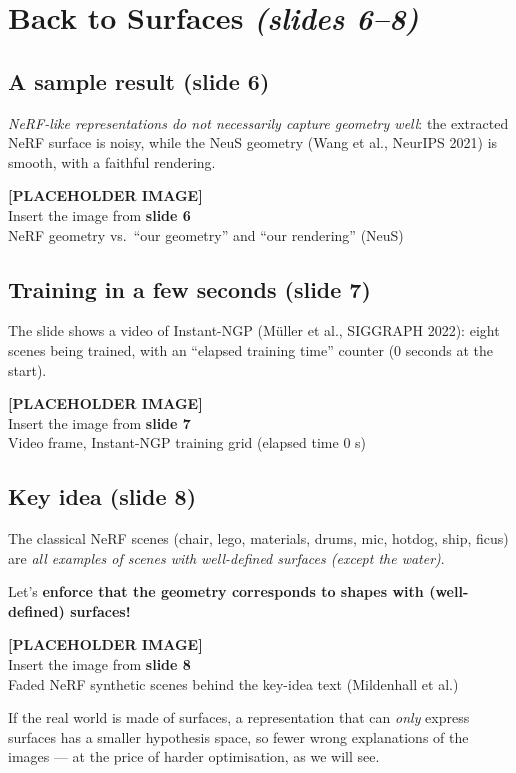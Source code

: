 \documentclass[11pt,a4paper]{article}
\newcommand{\slideimg}[2]{%
  \begin{center}
  \begin{tcolorbox}[enhanced,colback=gray!8,colframe=gray!8,width=0.92\linewidth,
    halign=center,valign=center,height=3.4cm,
    overlay={\draw[dashed,gray!70,thick] (frame.south west) rectangle (frame.north east);}]
  \textbf{[PLACEHOLDER IMAGE]}\\ Insert the image from \textbf{#1}\\ {\small #2}
  \end{tcolorbox}
  \end{center}}
\begin{document}
\section{Back to Surfaces \emph{(slides 6--8)}}
\subsection*{A sample result (slide 6)}
\emph{NeRF-like representations do not necessarily capture geometry well}: the extracted NeRF surface is noisy, while
the NeuS geometry (Wang et al., NeurIPS 2021) is smooth, with a faithful rendering.

\slideimg{slide 6}{NeRF geometry vs.\ ``our geometry'' and ``our rendering'' (NeuS)}

\subsection*{Training in a few seconds (slide 7)}
The slide shows a video of Instant-NGP (M\"uller et al., SIGGRAPH 2022): eight scenes being trained, with an
``elapsed training time'' counter (0 seconds at the start).

\slideimg{slide 7}{Video frame, Instant-NGP training grid (elapsed time 0 s)}

\subsection*{Key idea (slide 8)}
The classical NeRF scenes (chair, lego, materials, drums, mic, hotdog, ship, ficus) are \emph{all examples of scenes
with well-defined surfaces (except the water)}.

\begin{tcolorbox}[colback=white,colframe=black!60,title=Key idea]
Let's \textbf{enforce that the geometry corresponds to shapes with (well-defined) surfaces!}
\end{tcolorbox}

\slideimg{slide 8}{Faded NeRF synthetic scenes behind the key-idea text (Mildenhall et al.)}

\begin{intuition}
If the real world is made of surfaces, a representation that can \emph{only} express surfaces has a smaller
hypothesis space, so fewer wrong explanations of the images --- at the price of harder optimisation, as we will see.
\end{intuition}
\end{document}

